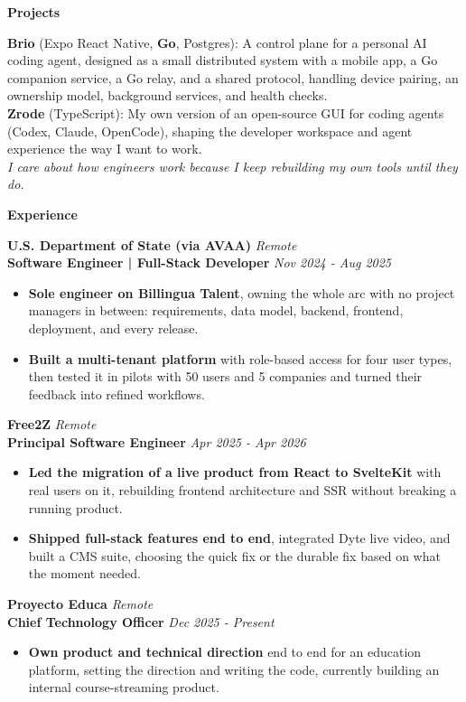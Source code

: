 \documentclass[10pt]{article}
\newcommand{\sectiontitle}[1]{%
    \vspace{5pt}
    \begin{center}
        \textbf{#1}
    \end{center}
    \vspace{-6pt}
}
\begin{document}
\sectiontitle{Projects}
\textbf{Brio} (Expo React Native, \textbf{Go}, Postgres): A control plane for a personal AI coding agent, designed as a small distributed system with a mobile app, a Go companion service, a Go relay, and a shared protocol, handling device pairing, an ownership model, background services, and health checks. \\
\textbf{Zrode} (TypeScript): My own version of an open-source GUI for coding agents (Codex, Claude, OpenCode), shaping the developer workspace and agent experience the way I want to work. \\
\textit{I care about how engineers work because I keep rebuilding my own tools until they do.}

\sectiontitle{Experience}

\textbf{U.S. Department of State (via AVAA)} \hfill \textit{Remote} \\
\textbf{Software Engineer | Full-Stack Developer} \hfill \textit{Nov 2024 - Aug 2025}
\begin{itemize}
    \item \textbf{Sole engineer on Billingua Talent}, owning the whole arc with no project managers in between: requirements, data model, backend, frontend, deployment, and every release.
    \item \textbf{Built a multi-tenant platform} with role-based access for four user types, then tested it in pilots with 50 users and 5 companies and turned their feedback into refined workflows.
\end{itemize}

\vspace{4pt}
\textbf{Free2Z} \hfill \textit{Remote} \\
\textbf{Principal Software Engineer} \hfill \textit{Apr 2025 - Apr 2026}
\begin{itemize}
    \item \textbf{Led the migration of a live product from React to SvelteKit} with real users on it, rebuilding frontend architecture and SSR without breaking a running product.
    \item \textbf{Shipped full-stack features end to end}, integrated Dyte live video, and built a CMS suite, choosing the quick fix or the durable fix based on what the moment needed.
\end{itemize}

\vspace{4pt}
\textbf{Proyecto Educa} \hfill \textit{Remote} \\
\textbf{Chief Technology Officer} \hfill \textit{Dec 2025 - Present}
\begin{itemize}
    \item \textbf{Own product and technical direction} end to end for an education platform, setting the direction and writing the code, currently building an internal course-streaming product.
\end{itemize}
\end{document}
